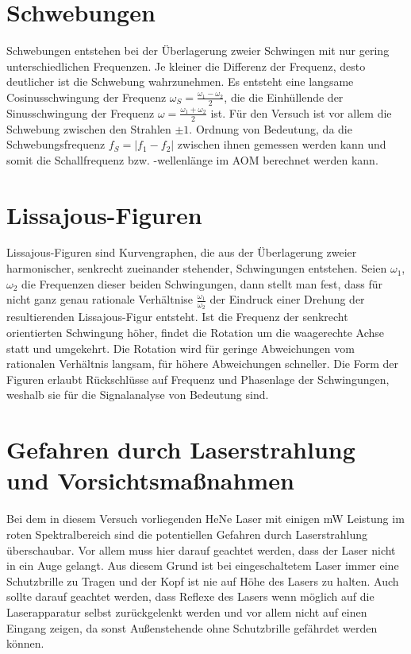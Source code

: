\documentclass[bigchapter,colorback,accentcolor=tud4b,linedtoc,11pt]{tudreport}
\begin{document}
\section{Schwebungen}

Schwebungen entstehen bei der Überlagerung zweier Schwingen mit nur gering unterschiedlichen Frequenzen. Je kleiner die Differenz der Frequenz, desto deutlicher ist die Schwebung wahrzunehmen. Es entsteht eine langsame Cosinusschwingung der Frequenz $\omega_S = \frac{\omega_1 - \omega_2}{2}$, die die Einhüllende der Sinusschwingung der Frequenz $\omega = \frac{\omega_1 + \omega_2}{2}$ ist. Für den Versuch ist vor allem die Schwebung zwischen den Strahlen $\pm 1$. Ordnung von Bedeutung, da die Schwebungsfrequenz $f_S = |f_1 - f_2|$ zwischen ihnen gemessen werden kann und somit die Schallfrequenz bzw. -wellenlänge im AOM berechnet werden kann.

\section{Lissajous-Figuren}

Lissajous-Figuren sind Kurvengraphen, die aus der Überlagerung zweier harmonischer, senkrecht zueinander stehender, Schwingungen entstehen. Seien $\omega_1$, $\omega_2$ die Frequenzen dieser beiden Schwingungen, dann stellt man fest, dass für nicht ganz genau rationale Verhältnise $\frac{\omega_1}{\omega_2}$ der Eindruck einer Drehung der resultierenden Lissajous-Figur entsteht. Ist die Frequenz der senkrecht orientierten Schwingung höher, findet die Rotation um die waagerechte Achse statt und umgekehrt. Die Rotation wird für geringe Abweichungen vom rationalen Verhältnis langsam, für höhere Abweichungen schneller. Die Form der Figuren erlaubt Rückschlüsse auf Frequenz und Phasenlage der Schwingungen, weshalb sie für die Signalanalyse von Bedeutung sind.

\section{Gefahren durch Laserstrahlung und Vorsichtsmaßnahmen} %

Bei dem in diesem Versuch vorliegenden HeNe Laser mit einigen mW Leistung im roten Spektralbereich sind die potentiellen Gefahren durch Laserstrahlung überschaubar. Vor allem muss hier darauf geachtet werden, dass der Laser nicht in ein Auge gelangt. Aus diesem Grund ist bei eingeschaltetem Laser immer eine Schutzbrille zu Tragen und der Kopf ist nie auf Höhe des Lasers zu halten. Auch sollte darauf geachtet werden, dass Reflexe des Lasers wenn möglich auf die Laserapparatur selbst zurückgelenkt werden und vor allem nicht auf einen Eingang zeigen, da sonst Außenstehende ohne Schutzbrille gefährdet werden können.
\end{document}
